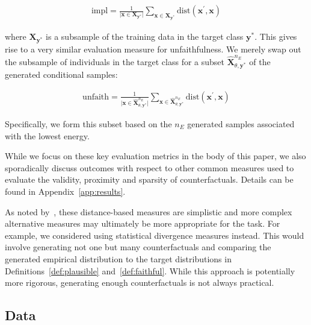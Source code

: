 \documentclass{article}
\begin{document}
\begin{equation}\label{eq:impl}
  \begin{aligned}
    \text{impl} = \frac{1}{\lvert\mathbf{x} \in \mathbf{X}_{\mathbf{y}^*}\rvert} \sum_{\mathbf{x} \in \mathbf{X}_{\mathbf{y}^*}} \text{dist}(\mathbf{x}^{\prime},\mathbf{x})
  \end{aligned}
\end{equation}

where $\mathbf{X}_{\mathbf{y}^*}$ is a subsample of the training data in the target class $\mathbf{y}^*$. This gives rise to a very similar evaluation measure for unfaithfulness. We merely swap out the subsample of individuals in the target class for a subset $\hat{\mathbf{X}}^{n_E}_{\theta,\mathbf{y}^*}$ of the generated conditional samples:

\begin{equation}\label{eq:faith}
  \begin{aligned}
    \text{unfaith} = \frac{1}{\lvert\mathbf{x} \in \hat{\mathbf{X}}^{n_E}_{\theta,\mathbf{y}^*}\rvert} \sum_{\mathbf{x} \in \hat{\mathbf{X}}^{n_E}_{\theta,\mathbf{y}^*}} \text{dist}(\mathbf{x}^{\prime},\mathbf{x})
  \end{aligned}
\end{equation}

Specifically, we form this subset based on the $n_E$ generated samples associated with the lowest energy. 

While we focus on these key evaluation metrics in the body of this paper, we also sporadically discuss outcomes with respect to other common measures used to evaluate the validity, proximity and sparsity of counterfactuals. Details can be found in Appendix~\ref{app:results}.

As noted by~\citet{guidotti2022counterfactual}, these distance-based measures are simplistic and more complex alternative measures may ultimately be more appropriate for the task. For example, we considered using statistical divergence measures instead. This would involve generating not one but many counterfactuals and comparing the generated empirical distribution to the target distributions in Definitions~\ref{def:plausible} and~\ref{def:faithful}. While this approach is potentially more rigorous, generating enough counterfactuals is not always practical. 

\subsection{Data}
\end{document}
